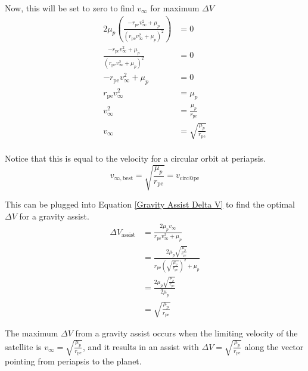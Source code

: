 \documentclass[../main.tex]{subfiles}
\begin{document}
Now, this will be set to zero to find $v_\infty$ for maximum $\Delta V$
\begin{align*}
    2\mu_p\left(\frac{-r_\text{pe}v_\infty^2+\mu_p}{(r_\text{pe}v_\infty^2+\mu_p)^2}\right) & = 0                                \\
    \frac{-r_\text{pe}v_\infty^2+\mu_p}{(r_\text{pe}v_\infty^2+\mu_p)^2}                    & = 0                                \\
    -r_\text{pe}v_\infty^2+\mu_p                                                            & = 0                                \\
    r_\text{pe}v_\infty^2                                                                   & = \mu_p                            \\
    v_\infty^2                                                                              & = \frac{\mu_p}{r_\text{pe}}        \\
    v_\infty                                                                                & = \sqrt{\frac{\mu_p}{r_\text{pe}}} \\
\end{align*}

Notice that this is equal to the velocity for a circular orbit at periapsis.
\begin{equation}\label{Gravity Assist Best Vinfty}
    v_{\infty,\text{best}} = \sqrt{\frac{\mu_p}{r_\text{pe}}} = v_\text{circ@pe}
\end{equation}

This can be plugged into Equation \eqref{Gravity Assist Delta V} to find the optimal $\Delta V$ for a gravity assist.
\begin{align*}
    \Delta V_\text{assist} & =\frac{2\mu_p v_\infty}{r_\text{pe}v_\infty^2+\mu_p}                                                              \\
                           & =\frac{2\mu_p \sqrt{\frac{\mu_p}{r_\text{pe}}}}{r_\text{pe}\left(\sqrt{\frac{\mu_p}{r_\text{pe}}}\right)^2+\mu_p} \\
                           & =\frac{2\mu_p \sqrt{\frac{\mu_p}{r_\text{pe}}}}{2\mu_p}                                                           \\
                           & =\sqrt{\frac{\mu_p}{r_\text{pe}}}
\end{align*}

The maximum $\Delta V$ from a gravity assist occurs when the limiting velocity of the satellite is $v_\infty=\sqrt{\frac{\mu_p}{r_\text{pe}}}$, and it results in an assist with $\Delta V = \sqrt{\frac{\mu_p}{r_\text{pe}}}$ along the vector pointing from periapsis to the planet.
\end{document}
